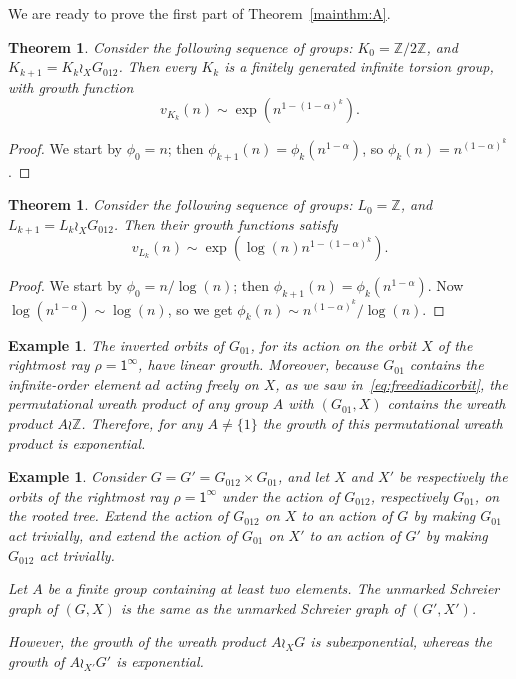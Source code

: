 \documentclass{amsart}
\newcommand\Z{\mathbb{Z}}
\newcommand\Grig{{G_{012}}}
\newcommand\Erschler{{G_{01}}}
\newtheorem{theorem}[lemma]{Theorem}
\newtheorem{example}[lemma]{Example}
\theoremstyle{definition}
\begin{document}
We are ready to prove the first part of Theorem~\ref{mainthm:A}.
\begin{theorem}\label{thm:K}
  Consider the following sequence of groups: $K_0=\Z/2\Z$, and
  $K_{k+1}=K_k\wr_X\Grig$. Then every $K_k$ is a finitely generated
  infinite torsion group, with growth function
  \[
  v_{K_k}(n)\sim \exp(n^{1-(1-\alpha)^k}).
  \]
\end{theorem}
\begin{proof}
  We start by $\phi_0=n$; then
  $\phi_{k+1}(n)=\phi_k(n^{1-\alpha})$, so
  $\phi_k(n)=n^{(1-\alpha)^k}$.
\end{proof}

\begin{theorem}\label{thm:L}
  Consider the following sequence of groups: $L_0=\Z$, and
  $L_{k+1}=L_k\wr_X\Grig$. Then their growth functions satisfy
  \[
  v_{L_k}(n)\sim\exp(\log(n)n^{1-(1-\alpha)^k}).
  \]
\end{theorem}
\begin{proof}
  We start by $\phi_0=n/\log(n)$; then
  $\phi_{k+1}(n)=\phi_k(n^{1-\alpha})$. Now
  $\log(n^{1-\alpha})\sim\log(n)$, so we get $\phi_k(n)\sim
  n^{(1-\alpha)^k}/\log(n)$.
\end{proof}

\begin{example}\label{ex:expgrowth}
  The inverted orbits of $\Erschler$, for its action on the orbit $X$
  of the rightmost ray $\rho=\mathsf1^\infty$, have linear growth.
  Moreover, because $\Erschler$ contains the infinite-order element
  $ad$ acting freely on $X$, as we saw in~\eqref{eq:freediadicorbit},
  the permutational wreath product of any group $A$ with
  $(\Erschler,X)$ contains the wreath product $A\wr\Z$. Therefore, for
  any $A \ne \{1\}$ the growth of this permutational wreath product is
  exponential.
\end{example}

\begin{example}\label{ex:differentgrowth}
  Consider $G= G'=\Grig \times \Erschler$, and let $X$ and $X'$ be
  respectively the orbits of the rightmost ray $\rho=\mathsf1^\infty$
  under the action of $\Grig$, respectively $\Erschler$, on the rooted
  tree.  Extend the action of $\Grig$ on $X$ to an action of $G$ by
  making $\Erschler$ act trivially, and extend the action of
  $\Erschler$ on $X'$ to an action of $G'$ by making $\Grig$ act
  trivially.

  Let $A$ be a finite group containing at least two elements. The
  unmarked Schreier graph of $(G,X)$ is the same as the unmarked
  Schreier graph of $(G',X')$.
  
  However, the growth of the wreath product $A\wr_X G$ is
  subexponential, whereas the growth of $A\wr_{X'}G'$ is exponential.
\end{example}
\end{document}
